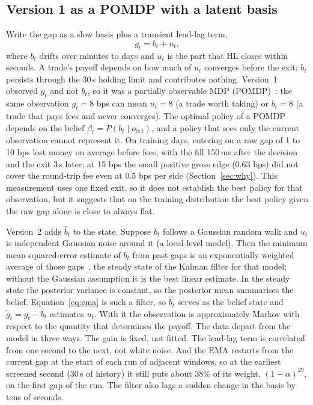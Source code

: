 \documentclass[12pt,a4paper]{article}
\DeclareRobustCommand{\bps}{\ifmmode\,\text{bps}\else\,bps\fi}
\newcommand{\gt}{\tilde g}
\newcommand{\bh}{\hat b}
\begin{document}
\subsection{Version 1 as a POMDP with a latent basis}\label{sec:pomdp}
Write the gap as a slow basis plus a transient lead-lag term,
\begin{equation}
g_t=b_t+u_t,
\label{eq:decomp}
\end{equation}
where $b_t$ drifts over minutes to days and $u_t$ is the part that HL closes within seconds.
A trade's payoff depends on how much of $u_t$ converges before the exit; $b_t$ persists through
the 30\,s holding limit and contributes nothing. Version~1 observed $g_t$ and not $b_t$, so it
was a partially observable MDP (POMDP)~\cite{pomdp}: the same observation $g_t=8$\bps{} can mean
$u_t=8$ (a trade worth taking) or $b_t=8$ (a trade that pays fees and never converges). The
optimal policy of a POMDP depends on the belief $\beta_t=P(b_t\mid o_{0:t})$, and a policy that
sees only the current observation cannot represent it. On training days, entering on a raw
gap of 1 to 10\bps{} lost money on average before fees, with the fill 150\,ms after the
decision and the exit 3\,s later; at 15\bps{} the small positive gross edge (0.63\bps) did not
cover the round-trip fee even at 0.5\bps{} per side (Section~\ref{sec:why}). This measurement
uses one fixed exit, so it does not establish the best policy for that observation, but it
suggests that on the training distribution the best policy given the raw gap alone is close
to always flat.

Version~2 adds $\bh_t$ to the state. Suppose $b_t$ follows a Gaussian random walk and $u_t$ is
independent Gaussian noise around it (a local-level model). Then the minimum mean-squared-error
estimate of $b_t$ from past gaps is an exponentially weighted average of those
gaps~\cite{muth}, the steady state of the Kalman filter for that model; without the Gaussian
assumption it is the best linear estimate. In the steady state the posterior variance is
constant, so the posterior mean summarises the belief. Equation~\eqref{eq:ema} is such a
filter, so $\bh_t$ serves as the belief state and $\gt_t=g_t-\bh_t$ estimates $u_t$. With it
the observation is approximately Markov with respect to the quantity that determines the
payoff. The data depart from the model in three ways. The gain is fixed, not fitted. The
lead-lag term is correlated from one second to the next, not white noise. And the EMA
restarts from the current gap at the start of each run of adjacent windows, so at the earliest
screened second (30\,s of history) it still puts about 38\% of its weight,
$(1-\alpha)^{29}$, on the first gap of the run. The filter also lags a sudden change in the
basis by tens of seconds.
\end{document}
